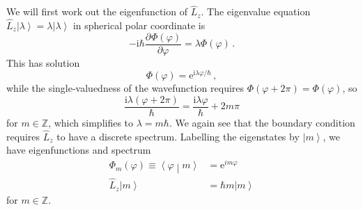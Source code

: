 \documentclass{article}
\theoremstyle{plain}\theoremheaderfont{\normalfont\itshape}\theorembodyfont{\rmfamily}\theoremseparator{.}\newtheorem*{rem}{Remark}\newtheorem*{ex}{Example}\newtheorem*{proof}{Proof}\newtheorem*{altp}{Alternative proof}
\theoremstyle{plain}\theoremheaderfont{\normalfont\bfseries}\theorembodyfont{\rmfamily}\theoremseparator{.}\newtheorem{thm}{Theorem}[section]\newtheorem{lem}[thm]{Lemma}\newtheorem{prop}[thm]{Proposition}\newtheorem*{cor}{Corollary}\newtheorem{defn}[thm]{Definition}\newtheorem{clm}[thm]{Claim}\newtheorem{clminproof}{Claim}
\theoremstyle{break}\theoremheaderfont{\normalfont\itshape}\theorembodyfont{\rmfamily}\theoremseparator{.\medskip}\newtheorem*{proofskip}{Proof}\newtheorem*{exs}{Examples}\newtheorem*{rems}{Remarks}
\theoremstyle{break}\theoremheaderfont{\normalfont\bfseries}\theorembodyfont{\rmfamily}\theoremseparator{.\medskip}\newtheorem{lemskip}[thm]{Lemma}\newtheorem{defnskip}[thm]{Definition}\newtheorem{propskip}[thm]{Proposition}\newtheorem{thmskip}[thm]{Theorem}
\numberwithin{equation}{section}
\newcommand{\ii}{\mathrm{i}}
\newcommand{\ee}{\mathrm{e}}
\newcommand{\pdv}[3][]{\frac{\partial^{#1} #2}{{\partial #3}^{#1}}}
\newcommand{\ket}[1]{\left| #1 \right\rangle}
\newcommand{\braket}[2]{\left\langle #1 \middle| #2 \right\rangle}
\begin{document}
    We will first work out the eigenfunction of \(\hat{L}_z\). The eigenvalue equation \(\hat{L}_z\ket{\lambda}=\lambda\ket{\lambda}\) in spherical polar coordinate is
    \begin{equation}
        -\ii\hbar\pdv{\Phi(\varphi)}{\varphi}=\lambda\Phi(\varphi)\,.
    \end{equation}
    This has solution
    \begin{equation}
        \Phi(\varphi)=\ee^{\ii \lambda\varphi/\hbar}\,,
    \end{equation}
    while the single-valuedness of the wavefunction requires \(\Phi(\varphi+2\pi)=\Phi(\varphi)\), so
    \begin{equation}
        \frac{\ii \lambda(\varphi+2\pi)}{\hbar}=\frac{\ii \lambda\varphi}{\hbar}+2m\pi
    \end{equation}
    for \(m\in\mathbb{Z}\), which simplifies to \(\lambda=m\hbar\). We again see that the boundary condition requires \(\hat{L}_z\) to have a discrete spectrum. Labelling the eigenstates by \(\ket{m}\), we have eigenfunctions and spectrum
    \begin{align}
        \Phi_m(\varphi)\equiv\braket{\varphi}{m}&=\ee^{im\varphi}\\
        \hat{L}_z\ket{m}&=\hbar m\ket{m}
    \end{align}
    for \(m\in\mathbb{Z}\).
\end{document}
